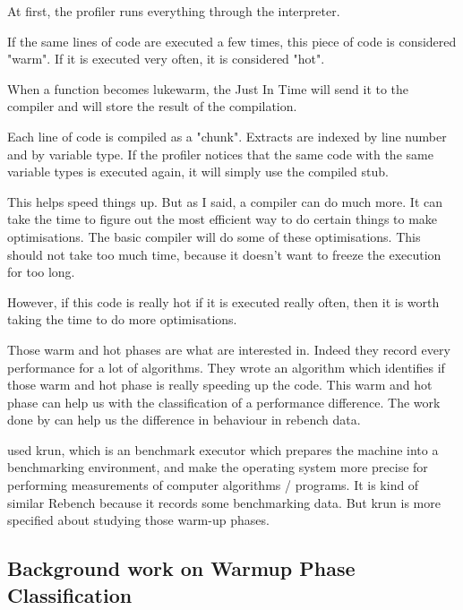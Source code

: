 \documentclass{article}
\begin{document}
At first, the profiler runs everything through the interpreter.

If the same lines of code are executed a few times, this piece of code is considered "warm". If it is executed very often, it is considered "hot".

When a function becomes lukewarm, the Just In Time will send it to the compiler and will store the result of the compilation.

Each line of code is compiled as a "chunk". Extracts are indexed by line number and by variable type. If the profiler notices that the same code with the same variable types is executed again, it will simply use the compiled stub.

This helps speed things up. But as I said, a compiler can do much more. It can take the time to figure out the most efficient way to do certain things to make optimisations. The basic compiler will do some of these optimisations. This should not take too much time, because it doesn't want to freeze the execution for too long.

However, if this code is really hot if it is executed really often, then it is worth taking the time to do more optimisations.

Those warm and hot phases are what \citep{barrett2017virtual} are interested in. Indeed they record every performance for a lot of algorithms. They wrote an algorithm which identifies if those warm and hot phase is really speeding up the code. This warm and hot phase can help us with the classification of a performance difference. The work done by \citep{barrett2017virtual} can help us the difference in behaviour in rebench data.

\citep{barrett2017virtual} used krun, which is an benchmark executor which prepares the machine into a benchmarking environment, and make the operating system more precise for performing  measurements of computer algorithms / programs. It is kind of similar Rebench because it records some benchmarking data. But krun is more specified about studying those warm-up phases.

\subsection{Background work on Warmup Phase Classification}
\end{document}
